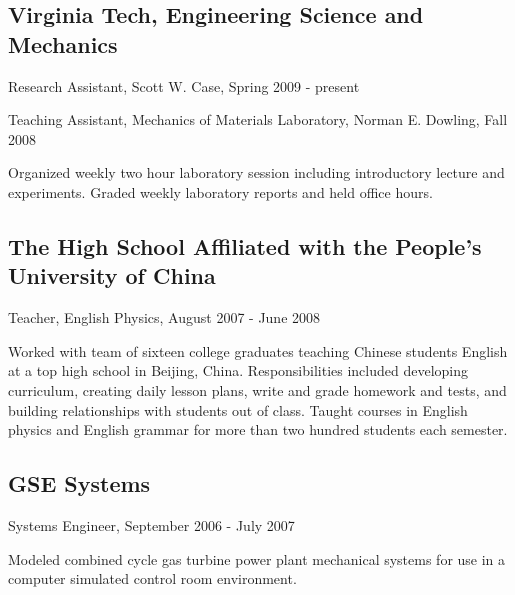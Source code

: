 \documentclass[10pt,letterpaper]{article}
\renewenvironment{itemize}{
  \begin{list}{}{
    \setlength{\leftmargin}{1.5em}
    \setlength{\itemsep}{0.25em}
    \setlength{\parskip}{0pt}
    \setlength{\parsep}{0.25em}
  }
}{
  \end{list}
}
\begin{document}
\subsection*{Virginia Tech, Engineering Science and Mechanics}

\begin{itemize}
\item Research Assistant, Scott W. Case, Spring 2009 - present
\item Teaching Assistant, Mechanics of Materials Laboratory, Norman E. Dowling, Fall 2008
    \begin{itemize}
    \item Organized weekly two hour laboratory session including introductory lecture and experiments.  Graded weekly laboratory reports and held office hours.
    \end{itemize}
\end{itemize}

\subsection*{The High School Affiliated with the People's University of China}
\begin{itemize}
\item Teacher, English Physics, August 2007 - June 2008
    \begin{itemize}
    \item Worked with team of sixteen college graduates teaching Chinese students English at a top high school in Beijing, China.  Responsibilities included developing curriculum, creating daily lesson plans, write and grade homework and tests, and building relationships with students out of class.  Taught courses in English physics and English grammar for more than two hundred students each semester.
    \end{itemize}
\end{itemize}

\subsection*{GSE Systems}

\begin{itemize}
\item Systems Engineer, September 2006 - July 2007
    \begin{itemize}
    \item Modeled combined cycle gas turbine power plant mechanical systems for use in a computer simulated control room environment.
    \end{itemize}
\end{itemize}
\end{document}

